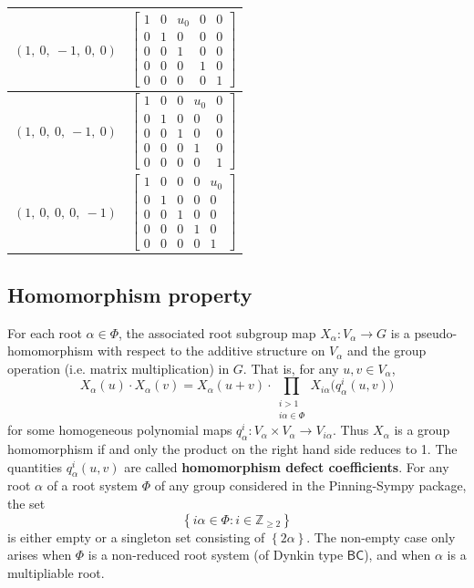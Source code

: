 \documentclass[11pt]{article}
\newcommand{\noi}{\noindent}
\newcommand{\tbf}{\textbf}
\newcommand{\lb}{\left\{}
\newcommand{\rb}{\right\}}
\newcommand{\Z}{\mathbb{Z}}
\theoremstyle{definition}
\begin{document}
\begin{longtable}{|l|c|}
    \hline
    $\left( 1, \  0, \  -1, \  0, \  0\right)$ & ${\left[\begin{matrix}1 & 0 & u_{0} & 0 & 0\\0 & 1 & 0 & 0 & 0\\0 & 0 & 1 & 0 & 0\\0 & 0 & 0 & 1 & 0\\0 & 0 & 0 & 0 & 1\end{matrix}\right]}$ \\
    \hline
    $\left( 1, \  0, \  0, \  -1, \  0\right)$ & ${\left[\begin{matrix}1 & 0 & 0 & u_{0} & 0\\0 & 1 & 0 & 0 & 0\\0 & 0 & 1 & 0 & 0\\0 & 0 & 0 & 1 & 0\\0 & 0 & 0 & 0 & 1\end{matrix}\right]}$ \\
    \hline
    $\left( 1, \  0, \  0, \  0, \  -1\right)$ & ${\left[\begin{matrix}1 & 0 & 0 & 0 & u_{0}\\0 & 1 & 0 & 0 & 0\\0 & 0 & 1 & 0 & 0\\0 & 0 & 0 & 1 & 0\\0 & 0 & 0 & 0 & 1\end{matrix}\right]}$ \\
    \hline
\end{longtable}


\subsection{Homomorphism property}

\noi For each root $\alpha \in \Phi$, the associated root subgroup map $X_\alpha:V_\alpha \to G$ is a pseudo-homomorphism with respect to the additive structure on $V_\alpha$ and the group operation (i.e. matrix multiplication) in $G$. That is, for any $u,v \in V_\alpha$,
\begin{equation}
\label{pseudo homomorphism}
	X_\alpha(u) \cdot X_\alpha(v) = X_\alpha(u+v) \cdot \prod_{\substack{i > 1 \\ i \alpha \in \Phi}} X_{i \alpha} \Big( q^i_\alpha(u,v) \Big)
\end{equation}
for some homogeneous polynomial maps $q^i_\alpha:V_\alpha \times V_\alpha \to V_{i \alpha}$. Thus $X_\alpha$ is a group homomorphism if and only the product on the right hand side reduces to 1. The quantities $q^i_\alpha(u,v)$ are called \tbf{homomorphism defect coefficients}. For any root $\alpha$ of a root system $\Phi$ of any group considered in the Pinning-Sympy package, the set
\[
	\lb i \alpha \in \Phi : i \in \Z_{\ge 2} \rb
\]
is either empty or a singleton set consisting of $\lb 2 \alpha \rb$. The non-empty case only arises when $\Phi$ is a non-reduced root system (of Dynkin type $\mathsf{BC}$), and when $\alpha$ is a multipliable root. 
\end{document}
